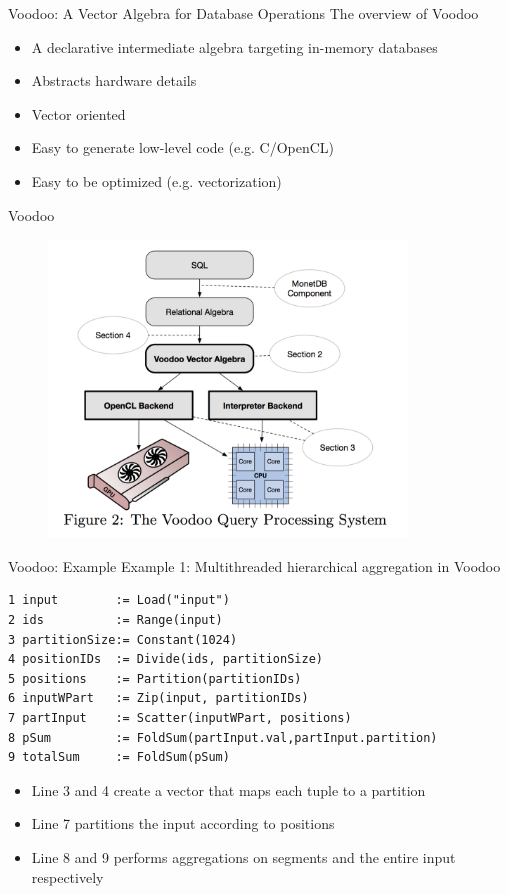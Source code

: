 \begin{frame}{Voodoo: A Vector Algebra for Database Operations}
The overview of Voodoo
\begin{itemize}
\item A declarative intermediate algebra targeting in-memory databases
\item Abstracts hardware details
\item Vector oriented
\item Easy to generate low-level code (e.g. C/OpenCL)
\item Easy to be optimized (e.g. vectorization)
\end{itemize}
\end{frame}

\begin{frame}{Voodoo}
\begin{figure}[htb]
\includegraphics[width=0.85\textwidth]{fig/voodoo-fig2.png}
\end{figure}
\end{frame}

\begin{frame}[fragile]{Voodoo: Example}
Example 1: Multithreaded hierarchical aggregation in Voodoo

\begin{lstlisting}[basicstyle=\footnotesize]
1 input        := Load("input")
2 ids          := Range(input)
3 partitionSize:= Constant(1024)
4 positionIDs  := Divide(ids, partitionSize)
5 positions    := Partition(partitionIDs)
6 inputWPart   := Zip(input, partitionIDs)
7 partInput    := Scatter(inputWPart, positions)
8 pSum         := FoldSum(partInput.val,partInput.partition)
9 totalSum     := FoldSum(pSum)
\end{lstlisting}
\begin{itemize}
\item Line 3 and 4 create a vector that maps each tuple to a partition
\item Line 7 partitions the input according to positions
\item Line 8 and 9 performs aggregations on segments and the entire input respectively
\end{itemize}
\end{frame}


